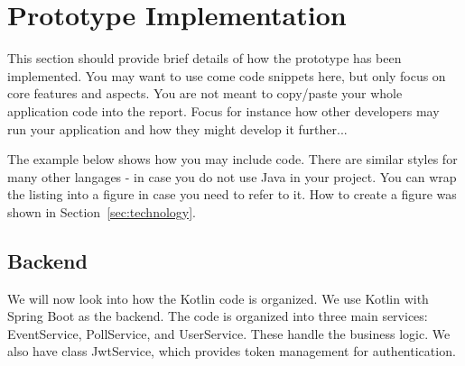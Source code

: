\section{Prototype Implementation}
\label{sec:implementation}


This section should provide brief details of how the prototype has been implemented.
You may want to use come code snippets here, but only focus on core features and aspects.
You are not meant to copy/paste your whole application code into the report.
Focus for instance how other developers may run your application and how they might develop it further...


The example below shows how you may include code. There are similar
styles for many other langages - in case you do not use Java in your
project. You can wrap the listing into a figure in case you need to
refer to it. How to create a figure was shown in Section~\ref{sec:technology}.



\subsection{Backend}

We will now look into how the Kotlin code is organized. We use Kotlin with Spring Boot as the backend. The code is organized into three main services: EventService, PollService, and UserService. These handle the business logic. We also have class JwtService,  which provides token management for authentication.
 
\vspace{1cm}

